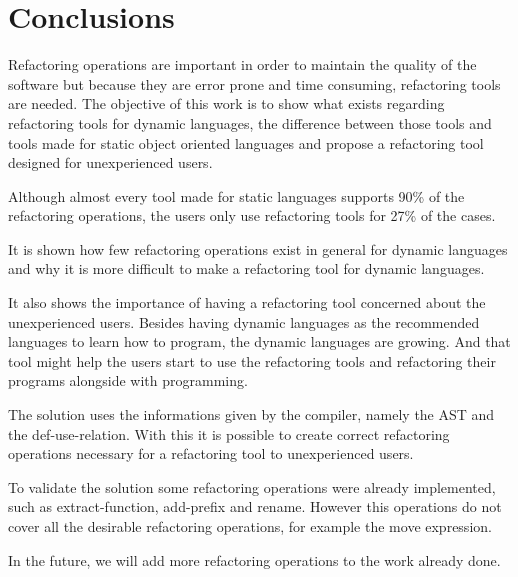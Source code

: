 
% 
% 

\section{Conclusions}


Refactoring operations are important in order to maintain the quality of the software but because they are error prone and time consuming, refactoring tools are needed.
The objective of this work is to show what exists regarding refactoring tools for dynamic languages, the difference between those tools and tools made for static object oriented languages and propose a refactoring tool designed for unexperienced users.


Although almost every tool made for static languages supports 90\% of the refactoring operations, the users only use refactoring tools for 27\% of the cases. %

It is shown how few refactoring operations exist in general for dynamic languages and why it is more difficult to make a refactoring tool for dynamic languages.

It also shows the importance of having a refactoring tool concerned about the unexperienced users. 
Besides having dynamic languages as the recommended languages to learn how to program, the dynamic languages are growing. 
And that tool might help the users start to use the refactoring tools and refactoring their programs alongside with programming.

The solution uses the informations given by the compiler, namely the AST and the def-use-relation. With this it is possible to create correct refactoring operations necessary for a refactoring tool to unexperienced users.

To validate the solution some refactoring operations were already implemented, such as extract-function, add-prefix and rename. However this operations do not cover all the desirable refactoring operations, for example the move expression.

In the future, we will add more refactoring operations to the work already done.